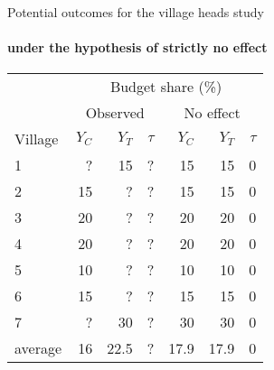 \begin{frame}{Potential outcomes for the village heads study}
\framesubtitle{under     the hypothesis of     strictly no effect}

\begin{tabular}{l|rrr|rrr} \hline
& \multicolumn{6}{c}{Budget share (\%)} \\
& \multicolumn{3}{c}{Observed} & \multicolumn{3}{c}{No effect} \\
Village &$Y_{C}$& $Y_{T}$& $\tau$  &$Y_{C}$& $Y_{T}$& $\tau$ \\ \hline
1&  ? & 15 & ? & 15 & 15 & 0 \\
2& 15 & ? &   ?  & 15 & 15 & 0 \\ 
3& 20 & ? &   ?  & 20 & 20 & 0 \\
4& 20 & ? &   ?  & 20 & 20 & 0 \\
5& 10 & ? &   ?  & 10 & 10 & 0 \\
6& 15 & ? &   ?  & 15 & 15 & 0 \\
7& ?   & 30&? & 30 &30 & 0 \\ \hline
average & 16 & 22.5 & ? & 17.9 & 17.9 & 0 \\ \hline
\end{tabular}
\end{frame}

